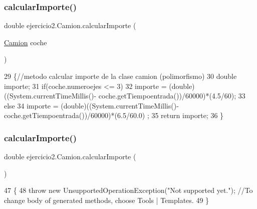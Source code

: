 \subsubsection{\texorpdfstring{calcular\+Importe()}{calcularImporte()}\hspace{0.1cm}{\footnotesize\ttfamily [1/2]}}
{\footnotesize\ttfamily double ejercicio2.\+Camion.\+calcular\+Importe (\begin{DoxyParamCaption}\item[{\mbox{\hyperlink{classejercicio2_1_1_camion}{Camion}}}]{coche }\end{DoxyParamCaption})\hspace{0.3cm}{\ttfamily [inline]}}


\begin{DoxyCode}
29                                                \{\textcolor{comment}{//metodo calcular importe de la clase camion (polimorfismo)}
30         \textcolor{keywordtype}{double} importe;
31         \textcolor{keywordflow}{if}(coche.numeroejes <= 3)
32                 importe = (double)((System.currentTimeMillis()- coche.getTiempoentrada())/60000)*(4.5/60);
33         \textcolor{keywordflow}{else}
34                 importe = (double)((System.currentTimeMillis()- coche.getTiempoentrada())/60000)*(6.5/60.0)
      ;
35         \textcolor{keywordflow}{return} importe;
36     \}
\end{DoxyCode}
\mbox{\label{classejercicio2_1_1_camion_a99d3e7a5a9433e553bac3386f196bc9b}} 
\subsubsection{\texorpdfstring{calcular\+Importe()}{calcularImporte()}\hspace{0.1cm}{\footnotesize\ttfamily [2/2]}}
{\footnotesize\ttfamily double ejercicio2.\+Camion.\+calcular\+Importe (\begin{DoxyParamCaption}{ }\end{DoxyParamCaption})\hspace{0.3cm}{\ttfamily [inline]}}


\begin{DoxyCode}
47                                     \{
48         \textcolor{keywordflow}{throw} \textcolor{keyword}{new} UnsupportedOperationException(\textcolor{stringliteral}{"Not supported yet."}); \textcolor{comment}{//To change body of generated
       methods, choose Tools | Templates.}
49     \}
\end{DoxyCode}
\mbox{\label{classejercicio2_1_1_camion_acd892291ca5a4276973799bfd07dcd38}} 
